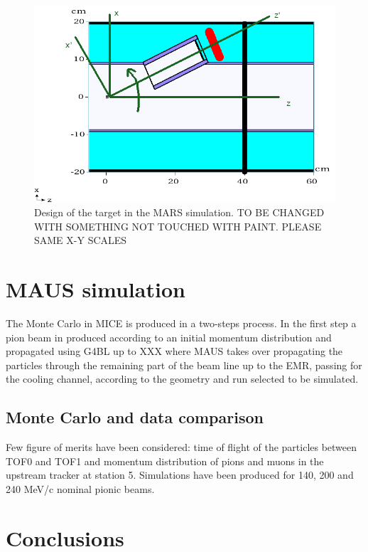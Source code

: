 \documentclass[a4paper,11pt]{article}
\begin{document}
\begin{figure}
  \begin{center}
    \includegraphics[width=1.0\columnwidth]{./figures/MARS1.png}
    \caption{Design of the target in the MARS simulation. TO BE CHANGED WITH SOMETHING NOT TOUCHED WITH PAINT. PLEASE SAME X-Y SCALES}
    \label{fig:MARS1}
  \end{center}
\end{figure}

\section{MAUS simulation}

The Monte Carlo in MICE is produced in a two-steps process. In the first step a pion beam in produced according to an initial momentum distribution and propagated using G4BL up to XXX where MAUS takes over propagating the particles through the remaining part of the beam line up to the EMR, passing for the cooling channel, according to the geometry and run selected to be simulated.

\subsection{Monte Carlo and data comparison}

Few figure of merits have been considered: time of flight of the particles between TOF0 and TOF1 and momentum distribution of pions and muons in the upstream tracker at station 5.
Simulations have been produced for 140, 200 and 240 MeV/c nominal pionic beams.

\section{Conclusions}

\end{document}
